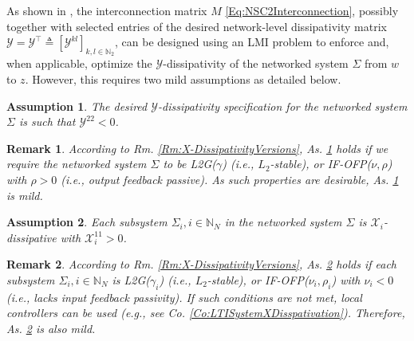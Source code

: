 \documentclass[letterpaper, 10 pt, conference]{ieeeconf}%
\newcommand{\N}{\mathbb{N}}
\newcommand{\T}{\top}
\newcommand{\0}{\mathbf{0}}
\newcommand{\X}{\mathcal{X}}
\newcommand{\Y}{\mathcal{Y}}
\newtheorem{assumption}{\textbf{Assumption}}
\newtheorem{remark}{\textbf{Remark}}
\begin{document}
As shown in \cite{Welikala2025Ax1}, the interconnection matrix $M$ \eqref{Eq:NSC2Interconnection}, possibly together with selected entries of the desired network-level dissipativity matrix $\Y=\Y^\T\triangleq[\Y^{kl}]_{k,l\in\N_2}$, can be designed using an LMI problem to enforce and, when applicable, optimize the $\Y$-dissipativity of the networked system $\Sigma$ from $w$ to $z$. However, this requires two mild assumptions as detailed below.  

\begin{assumption}\label{As:NegativeDissipativity}
The desired $\Y$-dissipativity specification for the networked system $\Sigma$ is such that $\Y^{22}<0$. 
\end{assumption} 

\begin{remark}\label{Rm:As:NegativeDissipativity}
According to Rm. \ref{Rm:X-DissipativityVersions}, As. \ref{As:NegativeDissipativity} holds if we require the networked system $\Sigma$ to be L2G($\gamma$) (i.e., $L_2$-stable), or IF-OFP($\nu,\rho$) with $\rho>0$ (i.e., output feedback passive). As such properties are desirable, As. \ref{As:NegativeDissipativity} is mild.
\end{remark}

\begin{assumption}\label{As:PositiveDissipativity}
Each subsystem $\Sigma_i, i\in\N_N$ in the networked system $\Sigma$ is $\X_i$-dissipative with $\X_i^{11} > 0$. 
\end{assumption}

\begin{remark}\label{Rm:As:PositiveDissipativity}
According to Rm. \ref{Rm:X-DissipativityVersions}, As. \ref{As:PositiveDissipativity} holds if each subsystem $\Sigma_i,i\in\N_N$ is L2G($\gamma_i$) (i.e., $L_2$-stable), or IF-OFP($\nu_i,\rho_i$) with $\nu_i<0$ (i.e., lacks input feedback passivity). If such conditions are not met, local controllers can be used (e.g., see Co. \ref{Co:LTISystemXDisspativation}). Therefore, As.  \ref{As:PositiveDissipativity} is also mild. 
\end{remark}
\end{document}
